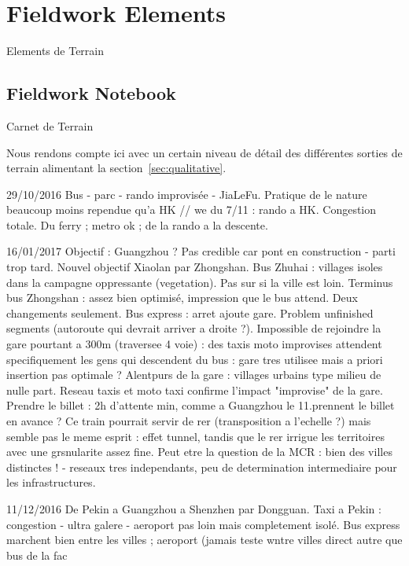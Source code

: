 




\section{Fieldwork Elements}{Elements de Terrain}


\subsection{Fieldwork Notebook}{Carnet de Terrain}

Nous rendons compte ici avec un certain niveau de détail des différentes sorties de terrain alimentant la section~\ref{sec:qualitative}.




29/10/2016
Bus - parc - rando improvisée - JiaLeFu.
Pratique de le nature beaucoup moins rependue qu'a HK
// we du 7/11 : rando a HK. Congestion totale. Du ferry ; metro ok ; de la rando a la descente.

16/01/2017
Objectif : Guangzhou ? Pas credible car pont en construction - parti trop tard. Nouvel objectif Xiaolan par Zhongshan. Bus Zhuhai : villages isoles dans la campagne oppressante (vegetation). Pas sur si la ville est loin. Terminus bus Zhongshan : assez bien optimisé, impression que le bus attend. Deux changements seulement. Bus express : arret ajoute gare. Problem unfinished segments (autoroute qui devrait arriver a droite ?). Impossible de rejoindre la gare pourtant a 300m (traversee 4 voie) : des taxis moto improvises attendent specifiquement les gens qui descendent du bus : gare tres utilisee mais a priori insertion pas optimale ? Alentpurs de la gare : villages urbains type milieu de nulle part. Reseau taxis et moto taxi confirme l'impact "improvise" de la gare. Prendre le billet : 2h d'attente min, comme a Guangzhou le 11.prennent le billet en avance ? Ce train pourrait servir de rer (transposition a l'echelle ?) mais semble pas le meme esprit : effet tunnel, tandis que le rer irrigue les territoires avec une grsnularite assez fine. Peut etre la question de la MCR : bien des villes distinctes ! - reseaux tres independants, peu de determination intermediaire pour les infrastructures.

11/12/2016
De Pekin a Guangzhou a Shenzhen par Dongguan. Taxi a Pekin : congestion - ultra galere - aeroport pas loin mais completement isolé. Bus express marchent bien entre les villes ; aeroport (jamais teste wntre villes direct autre que bus de la fac

